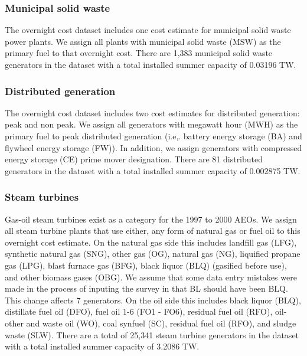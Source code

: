 \documentclass[10pt]{report}
\begin{document}
\subsubsection{Municipal solid waste}
The overnight cost dataset includes one cost estimate for municipal solid waste power plants.
We assign all plants with municipal solid waste (MSW) as the primary fuel to that overnight cost. 
There are 1,383 municipal solid waste generators in the dataset with a total installed summer capacity of  0.03196 TW. 

\subsubsection{Distributed generation}
The overnight cost dataset includes two cost estimates for distributed generation: peak and non peak.
We assign all generators with megawatt hour (MWH) as the primary fuel to peak distributed generation (i.e,. battery energy storage (BA) and flywheel energy storage (FW)). 
In addition, we assign generators with compressed energy storage (CE) prime mover designation.
There are 81 distributed generators in the dataset with a total installed summer capacity of 0.002875 TW. 

\subsubsection{Steam turbines}
Gas-oil steam turbines exist as a category for the 1997 to 2000 AEOs. 
We assign all steam turbine plants that use either, any form of natural gas or fuel oil to this overnight cost estimate. 
On the natural gas side this includes landfill gas (LFG), synthetic natural gas (SNG), other gas (OG), natural gas (NG), liquified propane gas (LPG), blast furnace gas (BFG), black liquor (BLQ) (gasified before use), and other biomass gases (OBG). 
We assume that some data entry mistakes were made in the process of inputing the survey in that BL should have been BLQ.
This change affects 7 generators.  
On the oil side this includes black liquor (BLQ), distillate fuel oil (DFO), fuel oil 1-6 (FO1 - FO6), residual fuel oil (RFO), oil-other and waste oil (WO), coal synfuel (SC), residual fuel oil (RFO), and sludge waste (SLW).
There are a total of 25,341 steam turbine generators in the dataset with a total installed summer capacity of 3.2086 TW.  
\end{document}
